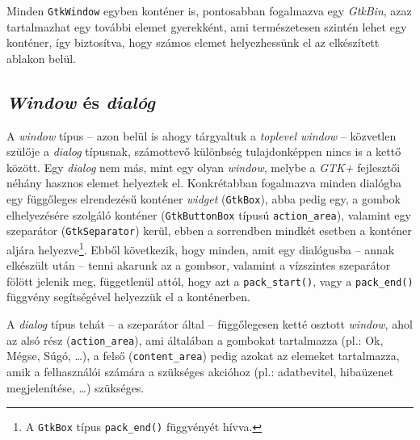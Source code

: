 Minden \texttt{GtkWindow} egyben konténer is, pontosabban fogalmazva egy \textit{GtkBin}, azaz tartalmazhat egy további elemet gyerekként, ami természetesen szintén lehet egy konténer, így biztosítva, hogy számos elemet helyezhessünk el az elkészített ablakon belül.

\subsection{\textit{Window} és \textit{dialóg}}

\label{par:dialogbox}
A \textit{window} típus -- azon belül is ahogy tárgyaltuk a \textit{toplevel window} -- közvetlen szülője a \textit{dialog} típusnak, számottevő különbség tulajdonképpen nincs is a kettő között. Egy \textit{dialog} nem más, mint egy olyan \textit{window}, melybe a \textit{GTK+} fejlesztői néhány hasznos elemet helyeztek el. Konkrétabban fogalmazva minden dialógba egy függőleges elrendezésű konténer \textit{widget} (\texttt{GtkBox}), abba pedig egy, a gombok elhelyezésére szolgáló konténer (\texttt{GtkButtonBox} típusú \texttt{action\_area}), valamint egy szeparátor (\texttt{GtkSeparator}) kerül, ebben a sorrendben mindkét esetben a konténer aljára helyezve\footnote{A \texttt{GtkBox} típus \texttt{pack\_end()} függvényét hívva.}. Ebből következik, hogy minden, amit egy dialógusba -- annak elkészült után -- tenni akarunk az a gombsor, valamint a vízszintes szeparátor fölött jelenik meg, függetlenül attól, hogy azt a \texttt{pack\_start()}, vagy a \texttt{pack\_end()} függvény segítségével helyezzük el a konténerben.

A \textit{dialog} típus tehát -- a szeparátor által -- függőlegesen ketté osztott \textit{window}, ahol az alsó rész (\texttt{action\_area}), ami általában a gombokat tartalmazza (pl.: Ok, Mégse, Súgó, \dots), a felső (\texttt{content\_area}) pedig azokat az elemeket tartalmazza, amik a felhasználói számára a szükséges akcióhoz (pl.: adatbevitel, hibaüzenet megjelenítése, \dots) szükséges.

